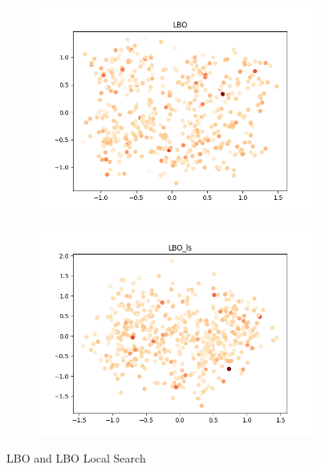 \documentclass[11pt, letterpaper, onecolumn]{article}
\begin{document}
\begin{figure}[h!]
  \centering
  \begin{subfigure}[b]{0.4\linewidth}
    \includegraphics[width=\linewidth]{graphs/LBO__pca.png}
  \end{subfigure}
  \begin{subfigure}[b]{0.4\linewidth}
    \includegraphics[width=\linewidth]{graphs/LBO_ls__pca.png}
  \end{subfigure}
  \caption{LBO and LBO Local Search}
  \label{fig:coffee}
\end{figure}
\end{document}
